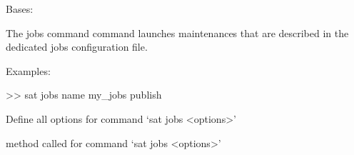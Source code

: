\documentclass[a4paper,10pt,english]{sphinxmanual}
\begin{document}
\begin{fulllineitems}
\label{\detokenize{apidoc_commands/commands:commands.jobs.Command}}
Bases: 

The jobs command command launches maintenances that are described in 
the dedicated jobs configuration file.

\begin{DUlineblock}{0em}
\item[] Examples:
\item[] \textgreater{}\textgreater{} sat jobs \textendash{}name my\_jobs \textendash{}publish
\end{DUlineblock}

\begin{fulllineitems}
\label{\detokenize{apidoc_commands/commands:commands.jobs.Command.getParser}}
Define all options for command ‘sat jobs \textless{}options\textgreater{}’

\end{fulllineitems}


\begin{fulllineitems}
\label{\detokenize{apidoc_commands/commands:commands.jobs.Command.name}}
\end{fulllineitems}


\begin{fulllineitems}
\label{\detokenize{apidoc_commands/commands:commands.jobs.Command.run}}
method called for command ‘sat jobs \textless{}options\textgreater{}’

\end{fulllineitems}


\end{fulllineitems}

\end{document}
